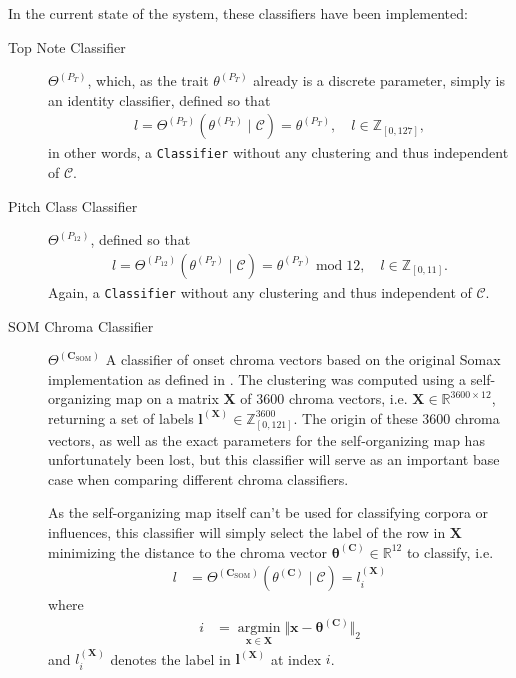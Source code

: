 In the current state of the system, these classifiers have been implemented:
 
 \begin{description}
 	\item[Top Note Classifier] $\Theta^{(P_T)}$, which, as the trait $\theta^{(P_T)}$ already is a discrete parameter, simply is an identity classifier, defined so that
 		\begin{align}
 			l = \Theta^{(P_T)}\left(\theta^{(P_T)}\mid \mathcal C \right) = \theta^{(P_T)}, \quad l \in \mathbb Z_{[0, 127]},
	 	\end{align}
	 	in other words, a \texttt{Classifier} without any clustering and thus independent of $\mathcal C$.
	 
	 	
	 \item[Pitch Class Classifier] $\Theta^{(P_{12})}$, defined so that 
	 	\begin{align}
	 		 l = \Theta^{(P_{12})}\left(\theta^{(P_T)}\mid \mathcal C \right) = \theta^{(P_T)} \operatorname{mod} 12, \quad l \in \mathbb Z_{[0, 11]}.
	 	\end{align}
		Again, a \texttt{Classifier} without any clustering and thus independent of $\mathcal C$.
	 
	 	
	 \item[SOM Chroma Classifier] $\Theta^{(\bm C_\text{SOM})}$ A classifier of onset chroma vectors based on the original Somax implementation as defined in \cite{bonnasse-gahot_update_2014}. The clustering was computed using a self-organizing map on a matrix $\bm X$ of 3600 chroma vectors, i.e. $\bm X \in \mathbb R^{3600\times 12}$, returning a set of labels $\bm l^{(\bm X)} \in \mathbb Z_{[0, 121]}^{3600}$. The origin of these 3600 chroma vectors, as well as the exact parameters for the self-organizing map has unfortunately been lost, but this classifier will serve as an important base case when comparing different chroma classifiers.
	 
	 As the self-organizing map itself can't be used for classifying corpora or influences, this classifier will simply select the label of the row in $\bm X$ minimizing the distance to the chroma vector $\bm \theta^{(\bm C)} \in \mathbb R^{12}$ to classify, i.e.
	 	\begin{align}\label{eq:3-csom-classification}
	 		l &= \Theta^{(\bm C_\text{SOM})}\left(\theta^{(\bm C)} \mid \mathcal C\right) = l_i^{(\bm X)}
	 	\end{align}
	 	where 
	 	\begin{align}
	 		i &= \operatorname*{argmin}_{\bm x \in \bm X} \Vert \bm x - \bm \theta^{(\bm C)} \Vert_2
	 	\end{align}
	 	and $l_i^{(\bm X)}$ denotes the label in $\bm l^{(\bm X)}$ at index $i$.
	 	

\end{description}
